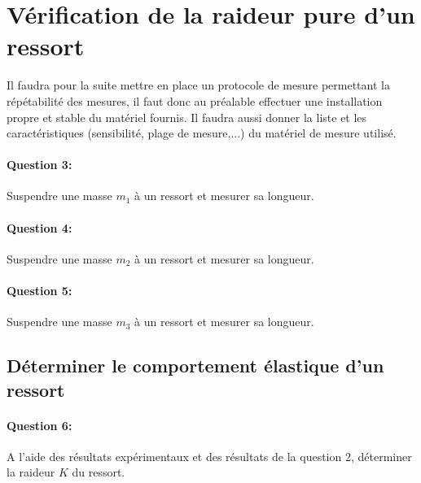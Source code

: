 

\section{Vérification de la raideur pure d'un ressort}

Il faudra pour la suite mettre en place un protocole de mesure permettant la répétabilité des mesures, il faut donc au préalable effectuer une installation propre et stable du matériel fournis. Il faudra aussi donner la liste et les caractéristiques (sensibilité, plage de mesure,...) du matériel de mesure utilisé.

\paragraph{Question 3:} Suspendre une masse $m_1$ à un ressort et mesurer sa longueur.

\paragraph{Question 4:} Suspendre une masse $m_2$ à un ressort et mesurer sa longueur.

\paragraph{Question 5:} Suspendre une masse $m_3$ à un ressort et mesurer sa longueur.

\subsection{Déterminer le comportement élastique d'un ressort}

\paragraph{Question 6:} A l'aide des résultats expérimentaux et des résultats de la question 2, déterminer la raideur $K$ du ressort.

